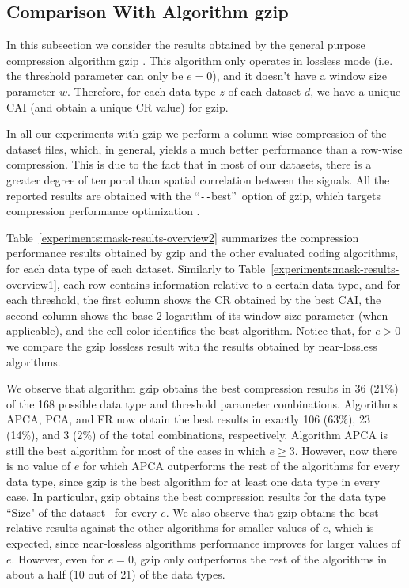 
\subsection{Comparison With Algorithm gzip}
\label{secX:gzip}


\newcommand{\bestdash}{``\texttt{-{}-}best''}
In this subsection we consider the results obtained by the general purpose compression algorithm gzip \cite{gzip}. This algorithm only operates in lossless mode (i.e. the threshold parameter can only be $e=0$), and it doesn't have a window size parameter $w$. Therefore, for each data type $z$ of each dataset $d$, we have a unique CAI (and obtain a unique CR value) for gzip. 

In all our experiments with gzip we perform a column-wise compression of the dataset files, which, in general, yields a much better performance than a row-wise compression. This is due to the fact that in most of our datasets, there is a greater degree of temporal than spatial correlation between the signals. All the reported results are obtained with the \bestdash\ option of gzip, which targets compression performance optimization \cite{gzipman}. 


Table~\ref{experiments:mask-results-overview2} summarizes the compression performance results obtained by gzip and the other evaluated coding algorithms, for each data type of each dataset. Similarly to Table~\ref{experiments:mask-results-overview1}, each row contains information relative to a certain data type, and for each threshold, the first column shows the CR obtained by the best CAI, the second column shows the base-2 logarithm of its window size parameter (when applicable), and the cell color identifies the best algorithm. Notice that, for $e > 0$ we compare the gzip lossless result with the results obtained by near-lossless algorithms.


We observe that algorithm gzip obtains the best compression results in 36 (21\%) of the 168 possible data type and threshold parameter combinations. Algorithms APCA, PCA, and FR now obtain the best results in exactly 106 (63\%), 23 (14\%), and 3 (2\%) of the total combinations, respectively. Algorithm APCA is still the best algorithm for most of the cases in which $e \geq 3$. However, now there is no value of $e$ for which APCA outperforms the rest of the algorithms for every data type, since gzip is the best algorithm for at least one data type in every case. In particular, gzip obtains the best compression results for the data type ``Size" of the dataset \datasethail\ for every $e$. We also observe that gzip obtains the best relative results against the other algorithms for smaller values of $e$, which is expected, since near-lossless algorithms performance improves for larger values of $e$. However, even for $e=0$, gzip only outperforms the rest of the algorithms in about a half (10 out of 21) of the data types.


